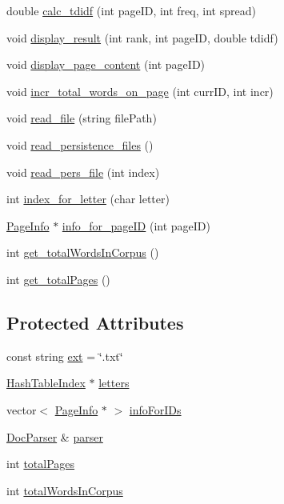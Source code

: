 \begin{DoxyCompactItemize}
\item 
double \hyperlink{class_index_interface_a8195aee88cd593c2e6ca2e2c48cbd068}{calc\+\_\+tdidf} (int page\+I\+D, int freq, int spread)
\item 
void \hyperlink{class_index_interface_a7e4d5fe8c31cfc9aa02c2dd1d7e1d3aa}{display\+\_\+result} (int rank, int page\+I\+D, double tdidf)
\item 
void \hyperlink{class_index_interface_a3d784385e028557312ef15d59574f9ed}{display\+\_\+page\+\_\+content} (int page\+I\+D)
\item 
void \hyperlink{class_index_interface_a5734b1488a787d47984bf97ffa5aff8d}{incr\+\_\+total\+\_\+words\+\_\+on\+\_\+page} (int curr\+I\+D, int incr)
\item 
void \hyperlink{class_index_interface_a229f1eb93f38d85d78e64e579c46c98a}{read\+\_\+file} (string file\+Path)
\item 
void \hyperlink{class_index_interface_aebcf89c2fd27b815b697c8e9d29e0c3a}{read\+\_\+persistence\+\_\+files} ()
\item 
void \hyperlink{class_index_interface_a0ca6250b71da3983ca31afdf3ee6dd88}{read\+\_\+pers\+\_\+file} (int index)
\item 
int \hyperlink{class_index_interface_a9a7539d9c7a48bf4d4fbe43961c0547f}{index\+\_\+for\+\_\+letter} (char letter)
\item 
\hyperlink{class_page_info}{Page\+Info} $\ast$ \hyperlink{class_index_interface_a2af7d88c3b2701be9164ba9f4a3bddb3}{info\+\_\+for\+\_\+page\+I\+D} (int page\+I\+D)
\item 
int \hyperlink{class_index_interface_a8a0132ad6e84c4340061496c615f581c}{get\+\_\+total\+Words\+In\+Corpus} ()
\item 
int \hyperlink{class_index_interface_af9edc24ac00bdf2c0e06384f890a1d8a}{get\+\_\+total\+Pages} ()
\end{DoxyCompactItemize}
\subsection*{Protected Attributes}
\begin{DoxyCompactItemize}
\item 
const string \hyperlink{class_index_interface_acd76893126e9fd5dc63cb4ea8f56265c}{ext} = \char`\"{}.txt\char`\"{}
\item 
\hyperlink{class_hash_table_index}{Hash\+Table\+Index} $\ast$ \hyperlink{class_index_interface_a8511509bb58da989f705ba75fd5dde2d}{letters}
\item 
vector$<$ \hyperlink{class_page_info}{Page\+Info} $\ast$ $>$ \hyperlink{class_index_interface_a8400a62750faa69ff35308ff731d9ee5}{info\+For\+I\+Ds}
\item 
\hyperlink{class_doc_parser}{Doc\+Parser} \& \hyperlink{class_index_interface_a42b0d9eccd309185ed92976f72908bb9}{parser}
\item 
int \hyperlink{class_index_interface_a2df695d2b504f2e53a0bfdd6bfee31da}{total\+Pages}
\item 
int \hyperlink{class_index_interface_ab607b430e78528cdb8bb79ba4afa91d2}{total\+Words\+In\+Corpus}
\end{DoxyCompactItemize}
